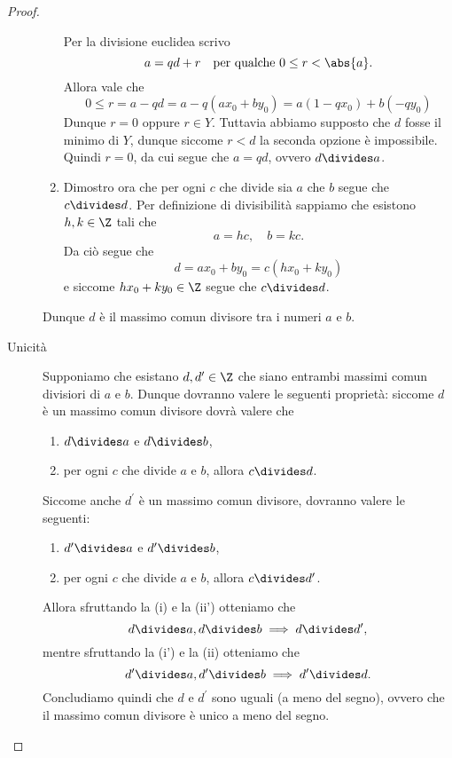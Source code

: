 \begin{proof}
\begin{description}
\begin{enumerate}[label={(\roman*)}]
            Per la divisione euclidea scrivo \begin{equation}
                a = qd + r \quad \text{per qualche } 0 \leq r < \abs{a}.
            \end{equation} Allora vale che\begin{equation*}
                0 \leq r = a - qd = a - q(ax_0 + by_0) = a(1 - qx_0) + b(-qy_0)
            \end{equation*}
            Dunque $r = 0$ oppure $r \in Y$. Tuttavia abbiamo supposto che $d$ fosse il minimo di $Y$, dunque siccome $r < d$ la seconda opzione è impossibile. Quindi $r = 0$, da cui segue che $a = qd$, ovvero $d \divides a$.
            \item Dimostro ora che per ogni $c$ che divide sia $a$ che $b$ segue che $c \divides d$.
            Per definizione di divisibilità sappiamo che esistono $h, k \in \Z$ tali che \[
                a = hc, \quad b = kc.    
            \] Da ciò segue che \[
                d = ax_0 + by_0 = c(hx_0 + ky_0)    
            \] e siccome $hx_0 + ky_0 \in \Z$ segue che $c \divides d$.
        \end{enumerate}
        Dunque $d$ è il massimo comun divisore tra i numeri $a$ e $b$.
        \item[Unicità] Supponiamo che esistano $d, d^\prime \in \Z$ che siano entrambi massimi comun divisiori di $a$ e $b$. Dunque dovranno valere le seguenti proprietà: siccome $d$ è un massimo comun divisore dovrà valere che \begin{enumerate}[label={(\roman*)}]
            \item $d \divides a$ e $d \divides b$,
            \item per ogni $c$ che divide $a$ e $b$, allora $c \divides d$.
        \end{enumerate} Siccome anche $d^\prime$ è un massimo comun divisore, dovranno valere le seguenti: \begin{enumerate}[label={(\roman*')}]
            \item $d^\prime \divides a$ e $d^\prime \divides b$,
            \item per ogni $c$ che divide $a$ e $b$, allora $c \divides d^\prime$.
        \end{enumerate}

        Allora sfruttando la (i) e la (ii') otteniamo che \[
            d \divides a, d \divides b \implies d \divides d^\prime,    
        \] mentre sfruttando la (i') e la (ii) otteniamo che \[
            d^\prime \divides a, d^\prime \divides b \implies d^\prime \divides d.   
        \] Concludiamo quindi che $d$ e $d^\prime$ sono uguali (a meno del segno), ovvero che il massimo comun divisore è unico a meno del segno. \qedhere
    \end{description}
\end{proof}


